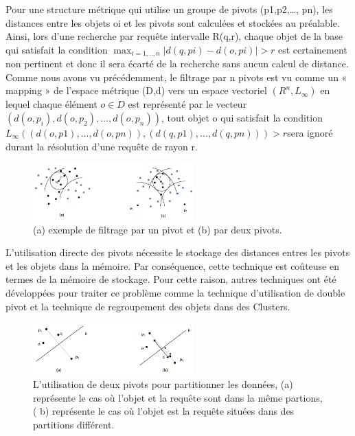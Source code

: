 Pour une structure métrique qui utilise un groupe de pivots (p1,p2,…, pn), les distances entre les objets oi et les pivots sont calculées et stockées au préalable. Ainsi, lors d’une recherche par requête intervalle R(q,r), chaque objet de la base qui satisfait la condition $ \max_{i=1,..,n}{|d(q,pi)-d(o,pi)|} > r $ est certainement non pertinent et donc il sera écarté de la recherche sans aucun calcul de distance. Comme nous avons vu précédemment, le filtrage par n pivots est vu comme un « mapping » de l’espace métrique (D,d) vers un espace vectoriel
$ (R^n, L_\infty) $ en lequel chaque élément $ o \in D $ est représenté par le vecteur $ (d(o,p_i), d(o,p_2),..., d(o,p_n)) $, tout objet o qui satisfait la condition $ L_\infty((d(o,p1),..., d(o,pn)),(d(q,p1),..., d(q,pn))) > r  $sera ignoré durant la résolution d’une requête de rayon r.

\begin{figure}[H]
	\centering
	\includegraphics[width=0.55\textwidth]{Figures/npivot.png} %
	\caption{(a) exemple de filtrage par un pivot et (b) par deux pivots.}
\end{figure}

L’utilisation directe des pivots nécessite le stockage des distances entres les pivots et les objets dans la mémoire. Par conséquence, cette technique est coûteuse en termes de la mémoire de stockage. Pour cette raison, autres techniques ont été développées pour traiter ce problème comme la technique d’utilisation de double pivot et la technique de regroupement des objets dans des Clusters.


\begin{figure}[H]
	\centering
	\includegraphics[width=0.55\textwidth]{Figures/2pivot.png} %
	\caption{L'utilisation de deux pivots pour partitionner les données, (a) représente le cas où
		l'objet et la requête sont dans la même partions,( b) représente le cas où l’objet est la requête
		situées dans des partitions différent.}
\end{figure}

